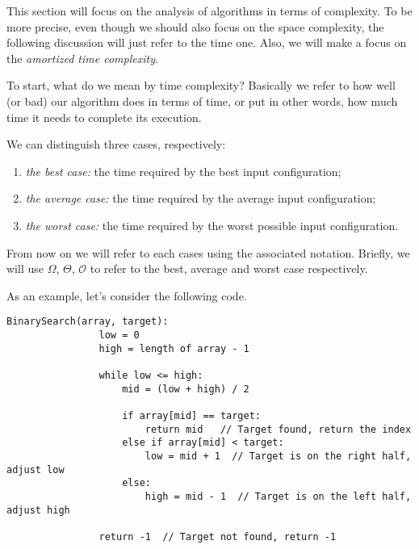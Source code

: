 \documentclass{subfiles}
\begin{document}
    This section will focus on the analysis of algorithms in terms of complexity.
    To be more precise, even though we should also focus on the space complexity,
    the following discussion will just refer to the time one.
    Also, we will make a focus on the \emph{amortized time complexity}.

    To start, what do we mean by time complexity? 
    Basically we refer to how well (or bad) our algorithm does in terms of time,
    or put in other words, how much time it needs to complete its execution.

    We can distinguish three cases, respectively:
    \begin{enumerate}
        \item \emph{the best case:} the time required by the best input configuration;
        \item \emph{the average case:} the time required by the average input configuration;
        \item \emph{the worst case:} the time required by the worst possible input configuration.
    \end{enumerate} 
    \begin{remark*}
        From now on we will refer to each cases using the associated notation.
        Briefly, we will use \(\Omega\), \(\Theta\), \(\mathcal{O}\) to refer to the 
        best, average and worst case respectively.
    \end{remark*}
    \begin{example*}
        As an example, let's consider the following code.
        \begin{lstlisting}[language=PSEUDO]
               BinarySearch(array, target):
                low = 0
                high = length of array - 1

                while low <= high:
                    mid = (low + high) / 2

                    if array[mid] == target:
                        return mid   // Target found, return the index
                    else if array[mid] < target:
                        low = mid + 1  // Target is on the right half, adjust low
                    else:
                        high = mid - 1  // Target is on the left half, adjust high

                return -1  // Target not found, return -1
        \end{lstlisting}
    \end{example*}
\end{document}
